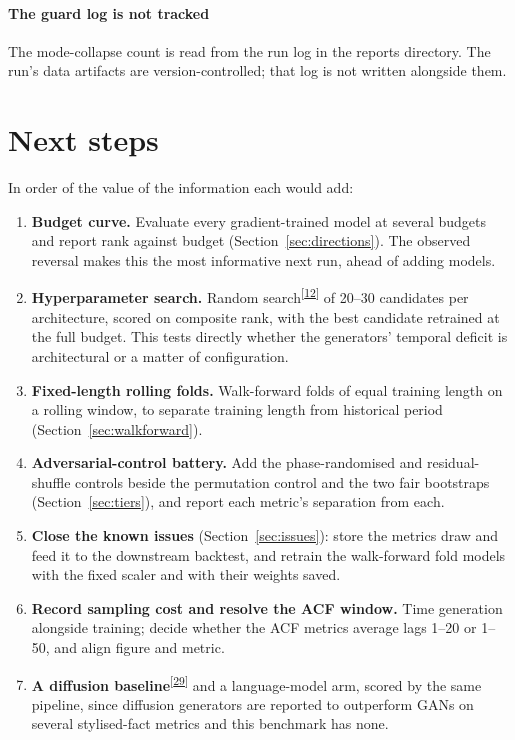 \documentclass[11pt,a4paper]{article}
\makeatletter
\newcommand{\tcite}[1]{\textsuperscript{[\hyperlink{R:#1}{#1}]}}
\DeclareRobustCommand{\_}{\ifmmode\nfss@text{\textunderscore}\else\textunderscore\allowbreak\fi}
\makeatother
\begin{document}
\paragraph{The guard log is not tracked} The mode-collapse count is read from the run log in the reports directory. The run's data artifacts are version-controlled; that log is not written alongside them.

\section{Next steps}
\label{sec:next}
In order of the value of the information each would add:
\begin{enumerate}
\item \textbf{Budget curve.} Evaluate every gradient-trained model at several budgets and report rank against budget (Section~\ref{sec:directions}). The observed reversal makes this the most informative next run, ahead of adding models.
\item \textbf{Hyperparameter search.} Random search\tcite{12} of 20--30 candidates per architecture, scored on composite rank, with the best candidate retrained at the full budget. This tests directly whether the generators' temporal deficit is architectural or a matter of configuration.
\item \textbf{Fixed-length rolling folds.} Walk-forward folds of equal training length on a rolling window, to separate training length from historical period (Section~\ref{sec:walkforward}).
\item \textbf{Adversarial-control battery.} Add the phase-randomised and residual-shuffle controls beside the permutation control and the two fair bootstraps (Section~\ref{sec:tiers}), and report each metric's separation from each.
\item \textbf{Close the known issues} (Section~\ref{sec:issues}): store the metrics draw and feed it to the downstream backtest, and retrain the walk-forward fold models with the fixed scaler and with their weights saved.
\item \textbf{Record sampling cost and resolve the ACF window.} Time generation alongside training; decide whether the ACF metrics average lags 1--20 or 1--50, and align figure and metric.
\item \textbf{A diffusion baseline}\tcite{29} and a language-model arm, scored by the same pipeline, since diffusion generators are reported to outperform GANs on several stylised-fact metrics and this benchmark has none.
\end{enumerate}
\clearpage
\end{document}
